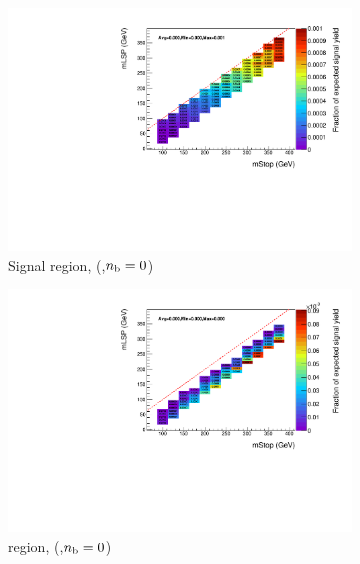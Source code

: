 \begin{figure}[p]
\begin{subfigure}[b]{0.47\textwidth}
    \includegraphics[width=\textwidth]{Figs/sms/t2degen/v23/effs/T2_4body_had_eff_maps_eq0b_ge4j_SITV.pdf}
    \caption{Signal region, (\njhigh,$n_{\text{b}}=0$)}
    \label{fig:t2_4body_sig_eff_ge4j_0b}
  \end{subfigure}
  \begin{subfigure}[b]{0.47\textwidth}
    \includegraphics[width=\textwidth]{Figs/sms/t2degen/v23/effs/T2_4body_muon_eff_maps_eq0b_ge4j_SITV.pdf}
    \caption{\mj region, (\njhigh,$n_{\text{b}}=0$)}
    \label{fig:t2_4body_mu_eff_ge4j_0b}
  \end{subfigure} \\
  \begin{subfigure}[b]{0.47\textwidth}

\end{subfigure}
\end{figure}
